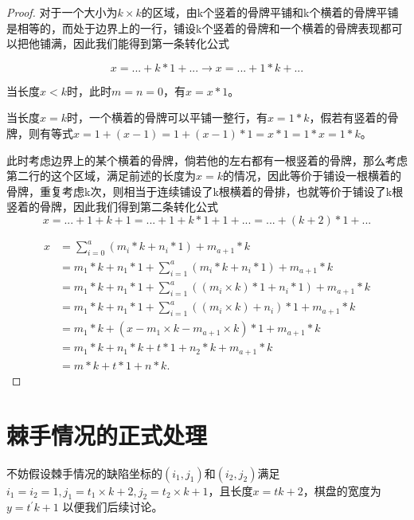 \begin{proof}

    对于一个大小为$k \times k$的区域，由k个竖着的骨牌平铺和k个横着的骨牌平铺是相等的，而处于边界上的一行，铺设k个竖着的骨牌和一个横着的骨牌表现都可以把他铺满，因此我们能得到第一条转化公式

    \begin{equation}
        x =... + k * 1 + ... \rightarrow x = ... + 1 * k + ...
    \end{equation}

    当长度$x < k$时，此时$m = n = 0$，有$x = x * 1$。

    当长度$x = k$时，一个横着的骨牌可以平铺一整行，有$x = 1 * k$，假若有竖着的骨牌，则有等式$x = 1 + (x - 1) = 1 + (x - 1) * 1 = x * 1 = 1 * x = 1 * k$。

    此时考虑边界上的某个横着的骨牌，倘若他的左右都有一根竖着的骨牌，那么考虑第二行的这个区域，满足前述的长度为$x = k$的情况，因此等价于铺设一根横着的骨牌，重复考虑k次，则相当于连续铺设了k根横着的骨排，也就等价于铺设了k根竖着的骨牌，因此我们得到第二条转化公式
    \begin{equation}
        x = ... + 1 + k + 1 = ... + 1 + k * 1 + 1 + ...= ... + (k + 2) * 1 + ...
    \end{equation}

    $$
        \begin{aligned}
            x & = \sum_{i=0}^{a} (m_i * k + n_i * 1) + m_{a+1} * k                                \\
              & = m_1 * k + n_1 * 1 + \sum_{i=1}^{a} (m_i * k + n_i * 1)+ m_{a+1} * k             \\
              & = m_1 * k + n_1 * 1 + \sum_{i=1}^{a} ((m_i \times k) * 1 + n_i * 1) + m_{a+1} * k \\
              & = m_1 * k + n_1 * 1 + \sum_{i=1}^{a} ((m_i \times k) + n_i) * 1 + m_{a+1} * k     \\
              & = m_1 * k + (x - m_1 \times k - m_{a+1} \times k) * 1 + m_{a+1} * k               \\
              & = m_1 * k + n_1 * k + t * 1 + n_2 * k + m_{a+1} * k                               \\
              & = m * k + t * 1 + n * k.
        \end{aligned}
    $$
\end{proof}

\section{棘手情况的正式处理}
不妨假设棘手情况的缺陷坐标的$(i_1, j_1)$和$(i_2, j_2)$满足$i_1 = i_2 = 1, j_1 = t_1 \times k + 2, j_2 = t_2 \times k + 1$，且长度$x = tk + 2$，棋盘的宽度为$y = t^{'}k + 1$ 以便我们后续讨论。

